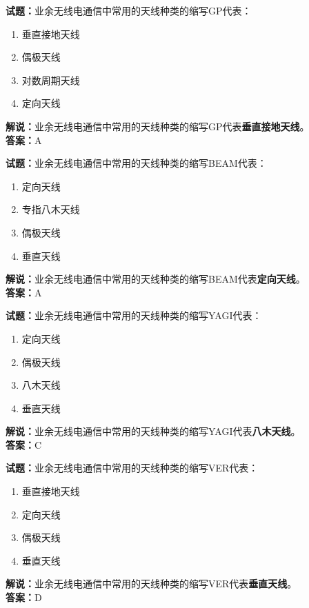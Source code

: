 \documentclass{ctexbook}
\begin{document}
\vspace{1em}

\textbf{试题：}业余无线电通信中常用的天线种类的缩写GP代表：
\begin{enumerate}[leftmargin=3em]
  \item 垂直接地天线
  \item 偶极天线
  \item 对数周期天线
  \item 定向天线
\end{enumerate}
\noindent\textbf{解说：}业余无线电通信中常用的天线种类的缩写GP代表\textbf{垂直接地天线}。\\\noindent\textbf{答案：}A

\vspace{1em}

\textbf{试题：}业余无线电通信中常用的天线种类的缩写BEAM代表：
\begin{enumerate}[leftmargin=3em]
  \item 定向天线
  \item 专指八木天线
  \item 偶极天线
  \item 垂直天线
\end{enumerate}
\noindent\textbf{解说：}业余无线电通信中常用的天线种类的缩写BEAM代表\textbf{定向天线}。\\\noindent\textbf{答案：}A

\vspace{1em}

\textbf{试题：}业余无线电通信中常用的天线种类的缩写YAGI代表：
\begin{enumerate}[leftmargin=3em]
  \item 定向天线
  \item 偶极天线
  \item 八木天线
  \item 垂直天线
\end{enumerate}
\noindent\textbf{解说：}业余无线电通信中常用的天线种类的缩写YAGI代表\textbf{八木天线}。\\\noindent\textbf{答案：}C

\vspace{1em}

\textbf{试题：}业余无线电通信中常用的天线种类的缩写VER代表：
\begin{enumerate}[leftmargin=3em]
  \item 垂直接地天线
  \item 定向天线
  \item 偶极天线
  \item 垂直天线
\end{enumerate}
\noindent\textbf{解说：}业余无线电通信中常用的天线种类的缩写VER代表\textbf{垂直天线}。\\\noindent\textbf{答案：}D
\end{document}

